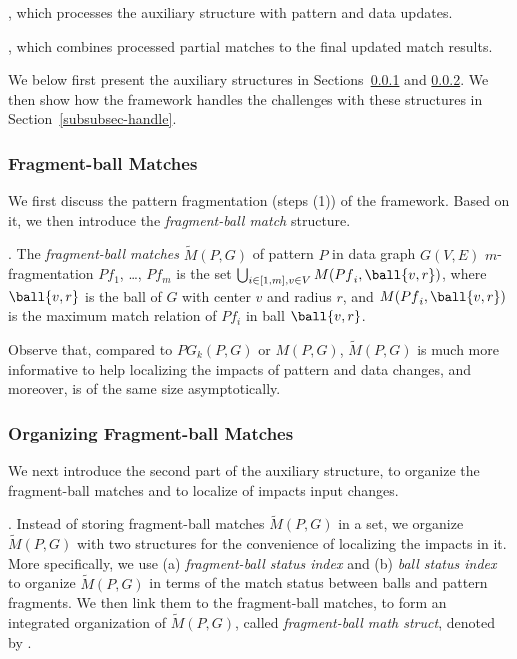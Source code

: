 , which processes the auxiliary structure with pattern and data updates.

, which combines processed partial matches to the final updated match results.


We below first present the auxiliary structures in Sections~\ref{subsubsec-fragmentation} and \ref{subsubsec-structure}. We then show how the framework handles the challenges with these structures in Section~\ref{subsubsec-handle}.

\subsubsection{Fragment-ball Matches}
\label{subsubsec-fragmentation}
We first discuss the pattern fragmentation (steps (1)) of the framework. Based on it, we then introduce the {\em fragment-ball match} structure.




.
The {\em fragment-ball matches} $\tilde{M}(P,G)$ of pattern $P$ in data graph $G(V,E)$ \wrt $m$-fragmentation ${Pf}_1$, \ldots, ${Pf}_m$ is the set $\bigcup_{i\in[1,m], v\in V} M({Pf}_i, \ball{v,r})$, where $\ball{v,r}$ is the ball of $G$ with center $v$ and radius $r$, and $M({Pf}_i, \ball{v,r})$ is the maximum match relation of ${Pf}_i$ in ball $\ball{v,r}$.

Observe that, compared to $PG_k(P,G)$ or $M(P,G)$, $\tilde{M}(P, G)$ is much more informative to help localizing the impacts of pattern and data changes, and moreover, is of the same size asymptotically.



\subsubsection{Organizing Fragment-ball Matches}
\label{subsubsec-structure}

We next introduce the second part of the auxiliary structure, to organize the fragment-ball matches and to localize of impacts \wrt input changes.

.
Instead of storing fragment-ball matches $\tilde{M}(P, G)$ in a set, we organize $\tilde{M}(P, G)$ with two structures for the convenience of localizing the impacts in it.
More specifically, we use (a) {\em fragment-ball status index} and (b) {\em ball status index} to organize $\tilde{M}(P, G)$ in terms of the match status between balls and pattern fragments. We then link them to the fragment-ball matches, to form an integrated organization of $\tilde{M}(P, G)$, called {\em fragment-ball math struct}, denoted by \fb.

